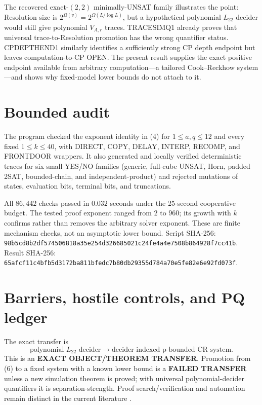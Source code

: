 \documentclass[11pt]{article}
\newcommand{\Ltwo}{L_{22}}
\begin{document}
The recovered exact-$(2,2)$ minimally-UNSAT family illustrates the point:
Resolution size is $2^{\Omega(v)}=2^{\Omega(L/\log L)}$, but a hypothetical
polynomial $\Ltwo$ decider would still give polynomial $V_{A,r}$ traces.
TRACESIMQ1 already proves that universal trace-to-Resolution promotion has
the wrong quantifier status.  CPDEPTHEND1 similarly identifies a sufficiently
strong CP depth endpoint but leaves computation-to-CP OPEN.  The present
result supplies the exact positive endpoint available from arbitrary
computation---a tailored Cook--Reckhow system---and shows why fixed-model
lower bounds do not attach to it.

\section{Bounded audit}
The program 
checked the exponent identity in (4) for $1\le a,q\le12$ and every fixed
$1\le k\le40$, with DIRECT, COPY, DELAY, INTERP, RECOMP, and FRONTDOOR
wrappers.  It also generated and locally verified deterministic traces for
six small YES/NO families (generic, full-cube UNSAT, Horn, padded 2SAT,
bounded-chain, and independent-product) and rejected mutations of states,
evaluation bits, terminal bits, and truncations.

All $86{,}442$ checks passed in $0.032$ seconds under the 25-second
cooperative budget.  The tested proof exponent ranged from $2$ to $960$;
its growth with $k$ confirms rather than removes the arbitrary solver
exponent.  These are finite mechanism checks, not an asymptotic lower bound.
Script SHA-256:
\texttt{98b5cd8b2df574506818a35e254d326685021c24fe4a4e7508b864928f7cc41b}.
Result SHA-256:
\texttt{65afcf11c4bfb5d3172ba811bfedc7b80db29355d784a70e5fe82e6e92fd073f}.

\section{Barriers, hostile controls, and PQ ledger}
The exact transfer is
\[
 \text{polynomial }\Ltwo\text{ decider}
 \longrightarrow \text{decider-indexed p-bounded CR system}.       \tag{6}
\]
This is an \textbf{EXACT OBJECT/THEOREM TRANSFER}.  Promotion from (6) to a
fixed system with a known lower bound is a \textbf{FAILED TRANSFER} unless a
new simulation theorem is proved; with universal polynomial-decider
quantifiers it is separation-strength.  Proof search/verification and
automation remain distinct in the current literature \cite{atserias}.
\end{document}
